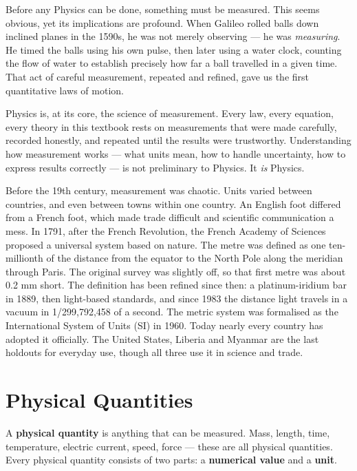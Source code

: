 Before any Physics can be done, something must be measured.
This seems obvious, yet its implications are profound. When
Galileo rolled balls down inclined planes in the 1590s, he
was not merely observing --- he was \textit{measuring}. He
timed the balls using his own pulse, then later using a
water clock, counting the flow of water to establish
precisely how far a ball travelled in a given time. That act
of careful measurement, repeated and refined, gave us the
first quantitative laws of motion.

Physics is, at its core, the science of measurement. Every
law, every equation, every theory in this textbook rests on
measurements that were made carefully, recorded honestly, and
repeated until the results were trustworthy. Understanding
how measurement works --- what units mean, how to handle
uncertainty, how to express results correctly --- is not
preliminary to Physics. It \textit{is} Physics.

\begin{historybox}
Before the 19th century, measurement was chaotic. Units varied between countries, and even between towns within one country. An English foot differed from a French foot, which made trade difficult and scientific communication a mess. In 1791, after the French Revolution, the French Academy of Sciences proposed a universal system based on nature. The metre was defined as one ten-millionth of the distance from the equator to the North Pole along the meridian through Paris. The original survey was slightly off, so that first metre was about 0.2 mm short.
The definition has been refined since then: a platinum-iridium bar in 1889, then light-based standards, and since 1983 the distance light travels in a vacuum in 1/299,792,458 of a second. The metric system was formalised as the International System of Units (SI) in 1960. Today nearly every country has adopted it officially. The United States, Liberia and Myanmar are the last holdouts for everyday use, though all three use it in science and trade.
\end{historybox}

\section{Physical Quantities}
\label{sec:physical_quantities}

A \textbf{physical quantity} is anything that can be measured.
Mass, length, time, temperature, electric current, speed,
force --- these are all physical quantities. Every physical
quantity consists of two parts: a \textbf{numerical value}
and a \textbf{unit}.

